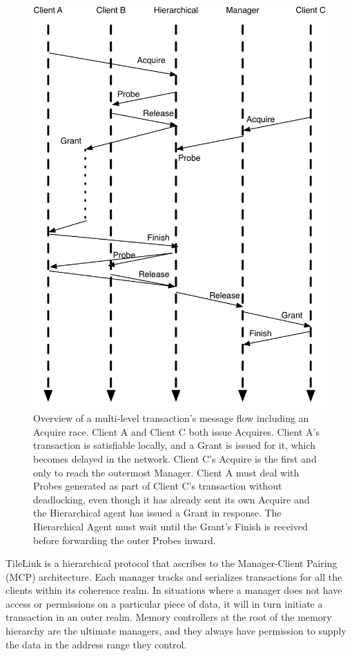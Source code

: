 \begin{figure}[!p]
\centering
\includegraphics[width=0.8\columnwidth]{tilelink/figures/acq-merge-5-2.pdf}
\caption[Overview of a multi-level transaction's message flow including an Acquire race.]{
Overview of a multi-level transaction's message flow including an Acquire race.
Client A and Client C both issue Acquires.
Client A's transaction is satisfiable locally, and a Grant is issued for it, which becomes delayed in the network.
Client C's Acquire is the first and only to reach the outermost Manager.
Client A must deal with Probes generated as part of Client C's transaction without deadlocking, even though it has already sent its own Acquire
and the Hierarchical agent has issued a Grant in response.
The Hierarchical Agent must wait until the Grant's Finish is received before forwarding the outer Probes inward.
}
\label{fig:acq-merge-5-2}
\end{figure}

TileLink is a hierarchical protocol that ascribes to the Manager-Client Pairing (MCP) architecture.
Each manager tracks and serializes transactions for all the clients within its coherence realm.
In situations where a manager does not have access or permissions on a particular piece of data,
it will in turn initiate a transaction in an outer realm.
Memory controllers at the root of the memory hierarchy are the ultimate managers, and they always have permission
to supply the data in the address range they control.

